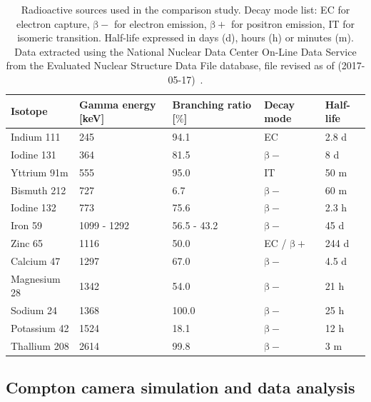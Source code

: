 \begin{table}[!htbp]
\centering
\caption{Radioactive sources used in the comparison study. Decay mode list: EC for electron capture, $\mathrm{\beta}-$ for electron emission, $\mathrm{\beta}+$  for positron emission, IT for isomeric transition. Half-life expressed in days (d), hours (h) or minutes (m). Data extracted using the National Nuclear Data Center On-Line Data Service from the Evaluated Nuclear Structure Data File database, file revised as of (2017-05-17)~\parencite{Bath1992}.}
\label{chap5::tab::table_sources}
\begin{tabular}{m{3cm} P{3cm} P{3cm} P{2cm} P{2cm}}
\toprule
{}
\textbf{Isotope}           & \textbf{Gamma energy [keV]} & \textbf{Branching ratio [$\%$]}& \textbf{Decay mode} & \textbf{Half-life}  \\
\midrule
Indium 111 		  & 245 		&	94.1	      & EC          				 	& 2.8 d       \\
Iodine 131		  & 364		&	81.5      & $\mathrm{\beta}-$         	& 8 d         \\
Yttrium 91m		  & 555		&	95.0      & IT        				 	& 50 m        \\
Bismuth 212		  & 727		&	 6.7      & $\mathrm{\beta}-$         	& 60 m        \\
Iodine 132		  & 773		&	75.6      & $\mathrm{\beta}-$         	& 2.3 h       \\
Iron 59		  	  & 1099 - 1292 & 56.5 - 43.2	& $\mathrm{\beta}-$  	& 45 d     \\
Zinc 65		  	  & 1116 	&	50.0  	  & EC / $\mathrm{\beta}+$     	& 244 d       \\
Calcium 47		  & 1297		&	67.0      & $\mathrm{\beta}-$        	& 4.5 d       \\
Magnesium 28		  & 1342 	&	54.0 	  & $\mathrm{\beta}-$         	& 21 h        \\
Sodium 24		  & 1368		&	100.0        & $\mathrm{\beta}-$         & 25 h        \\
Potassium 42  	  & 1524		&	18.1        & $\mathrm{\beta}-$         	& 12 h        \\
Thallium 208		  & 2614		&	99.8        & $\mathrm{\beta}-$        	& 3 m      \\
\bottomrule

\end{tabular}
\end{table}

\subsection{Compton camera simulation and data analysis}\label{chap5::subsec::CC_simu}
